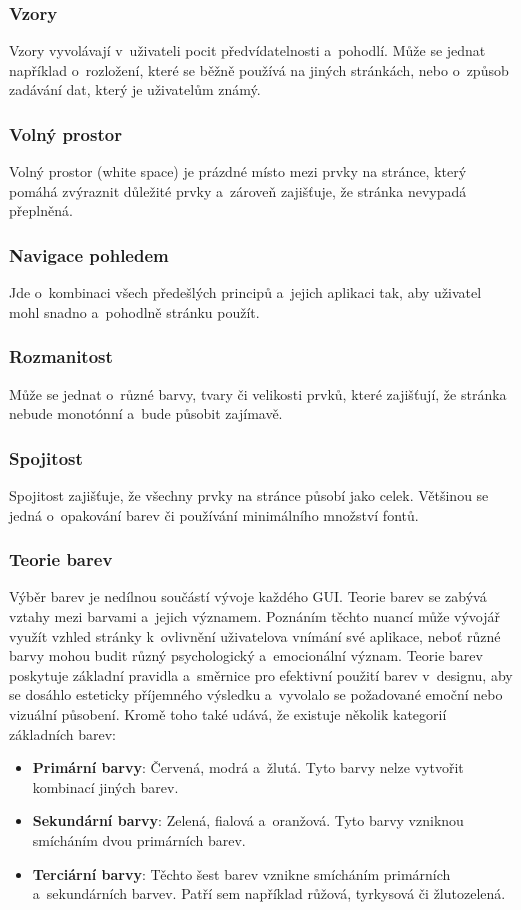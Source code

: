 \subsubsection*{Vzory}
Vzory vyvolávají v~uživateli pocit předvídatelnosti a~pohodlí. Může se jednat například o~rozložení, které se běžně používá na jiných stránkách, nebo o~způsob zadávání dat, který je uživatelům známý.

\subsubsection*{Volný prostor}
Volný prostor (white space) je prázdné místo mezi prvky na stránce, který pomáhá zvýraznit důležité prvky a~zároveň zajišťuje, že stránka nevypadá přeplněná.

\subsubsection*{Navigace pohledem}
Jde o~kombinaci všech předešlých principů a~jejich aplikaci tak, aby uživatel mohl snadno a~pohodlně stránku použít.

\subsubsection*{Rozmanitost}
Může se jednat o~různé barvy, tvary či velikosti prvků, které zajišťují, že stránka nebude monotónní a~bude působit zajímavě.

\subsubsection*{Spojitost}
Spojitost zajišťuje, že všechny prvky na stránce působí jako celek. Většinou se jedná o~opakování barev či používání minimálního množství fontů.

\subsubsection{Teorie barev}
Výběr barev je nedílnou součástí vývoje každého GUI. Teorie barev se zabývá vztahy mezi barvami a~jejich významem. Poznáním těchto nuancí může vývojář využít vzhled stránky k~ovlivnění uživatelova vnímání své aplikace, neboť různé barvy mohou budit různý psychologický a~emocionální význam. Teorie barev poskytuje základní pravidla a~směrnice pro efektivní použití barev v~designu, aby se dosáhlo esteticky příjemného výsledku a~vyvolalo se požadované emoční nebo vizuální působení. Kromě toho také udává, že existuje několik kategorií základních barev:
\begin{itemize}
    \item \textbf{Primární barvy}: Červená, modrá a~žlutá. Tyto barvy nelze vytvořit kombinací jiných barev.
    \item \textbf{Sekundární barvy}: Zelená, fialová a~oranžová. Tyto barvy vzniknou smícháním dvou primárních barev.
    \item \textbf{Terciární barvy}: Těchto šest barev vznikne smícháním primárních a~sekundárních barvev. Patří sem například růžová, tyrkysová či žlutozelená.
\end{itemize}

